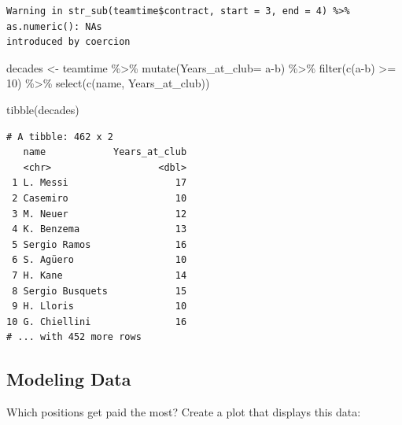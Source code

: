 \documentclass[
  letterpaper,
  DIV=11,
  numbers=noendperiod]{scrartcl}
\newenvironment{Shaded}{\begin{snugshade}}{\end{snugshade}}
\newcommand{\DecValTok}[1]{\textcolor[rgb]{0.68,0.00,0.00}{#1}}
\newcommand{\FunctionTok}[1]{\textcolor[rgb]{0.28,0.35,0.67}{#1}}
\newcommand{\NormalTok}[1]{\textcolor[rgb]{0.00,0.23,0.31}{#1}}
\newcommand{\OtherTok}[1]{\textcolor[rgb]{0.00,0.23,0.31}{#1}}
\newcommand{\SpecialCharTok}[1]{\textcolor[rgb]{0.37,0.37,0.37}{#1}}
\newcommand{\StringTok}[1]{\textcolor[rgb]{0.13,0.47,0.30}{#1}}
\begin{document}
\begin{verbatim}
Warning in str_sub(teamtime$contract, start = 3, end = 4) %>% as.numeric(): NAs
introduced by coercion
\end{verbatim}

\begin{Shaded}
\begin{Highlighting}[]
\NormalTok{decades }\OtherTok{\textless{}{-}}\NormalTok{ teamtime }\SpecialCharTok{\%\textgreater{}\%} 
  \FunctionTok{mutate}\NormalTok{(}\StringTok{\textquotesingle{}Years\_at\_club\textquotesingle{}}\OtherTok{=}\NormalTok{ a}\SpecialCharTok{{-}}\NormalTok{b) }\SpecialCharTok{\%\textgreater{}\%} 
  \FunctionTok{filter}\NormalTok{(}\FunctionTok{c}\NormalTok{(a}\SpecialCharTok{{-}}\NormalTok{b) }\SpecialCharTok{\textgreater{}=} \DecValTok{10}\NormalTok{) }\SpecialCharTok{\%\textgreater{}\%} 
  \FunctionTok{select}\NormalTok{(}\FunctionTok{c}\NormalTok{(name, Years\_at\_club))}

\FunctionTok{tibble}\NormalTok{(decades)}
\end{Highlighting}
\end{Shaded}

\begin{verbatim}
# A tibble: 462 x 2
   name            Years_at_club
   <chr>                   <dbl>
 1 L. Messi                   17
 2 Casemiro                   10
 3 M. Neuer                   12
 4 K. Benzema                 13
 5 Sergio Ramos               16
 6 S. Agüero                  10
 7 H. Kane                    14
 8 Sergio Busquets            15
 9 H. Lloris                  10
10 G. Chiellini               16
# ... with 452 more rows
\end{verbatim}

\hypertarget{modeling-data}{%
\subsection{Modeling Data}\label{modeling-data}}

Which positions get paid the most? Create a plot that displays this
data:
\end{document}

